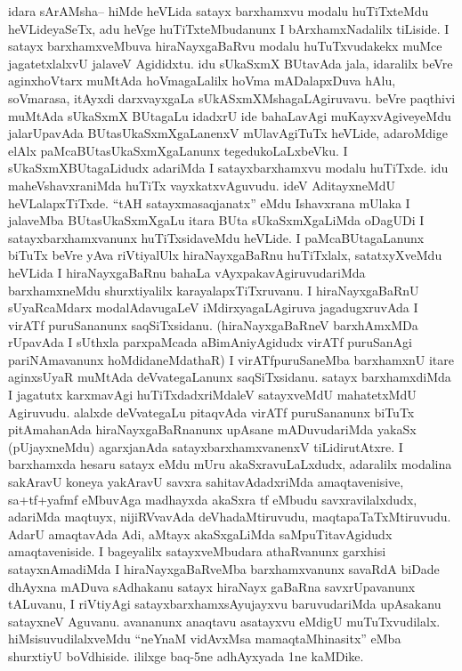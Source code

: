 \begin{artha}
idara sArAMsha{\rm --} hiMde heVLida satayx barxhamxvu modalu huTiTxteMdu heVLideyaSeTx, adu heVge huTiTxteMbudanunx I bArxhamxNadalilx tiLiside. I satayx barxhamxveMbuva hiraNayxgaBaRvu modalu huTuTxvudakekx muMce jagatetxlalxvU jalaveV Agididxtu. idu sUkaSxmX BUtavAda jala, idaralilx beVre aginxhoVtarx muMtAda hoVmagaLalilx hoVma mADalapxDuva hAlu, soVmarasa, itAyxdi darxvayxgaLa sUkASxmXMshagaLAgiruvavu. beVre paqthivi muMtAda sUkaSxmX BUtagaLu idadxrU ide bahaLavAgi muKayxvAgiveyeMdu jalarUpavAda BUtasUkaSxmXgaLanenxV mUlavAgiTuTx heVLide, adaroMdige elAlx paMcaBUtasUkaSxmXgaLanunx tegedukoLaLxbeVku. I sUkaSxmXBUtagaLidudx adariMda I satayxbarxhamxvu modalu huTiTxde. idu maheVshavxraniMda huTiTx vayxkatxvAguvudu. ideV AditayxneMdU heVLalapxTiTxde. ``tAH satayxmasaqjanatx'' eMdu Ishavxrana mUlaka I jalaveMba BUtasUkaSxmXgaLu itara BUta sUkaSxmXgaLiMda oDagUDi I satayxbarxhamxvanunx huTiTxsidaveMdu heVLide. I paMcaBUtagaLanunx biTuTx beVre yAva riVtiyalUlx hiraNayxgaBaRnu huTiTxlalx, satatxyXveMdu heVLida I hiraNayxgaBaRnu bahaLa vAyxpakavAgiruvudariMda barxhamxneMdu shurxtiyalilx karayalapxTiTxruvanu. I hiraNayxgaBaRnU sUyaRcaMdarx modalAdavugaLeV iMdirxyagaLAgiruva jagadugxruvAda I virATf puruSananunx saqSiTxsidanu. (hiraNayxgaBaRneV barxhAmxMDa rUpavAda I sUthxla parxpaMcada aBimAniyAgidudx virATf puruSanAgi pariNAmavanunx hoMdidaneMdathaR) I virATfpuruSaneMba barxhamxnU itare aginxsUyaR muMtAda deVvategaLanunx saqSiTxsidanu. satayx barxhamxdiMda I jagatutx karxmavAgi huTiTxdadxriMdaleV satayxveMdU mahatetxMdU Agiruvudu. alalxde deVvategaLu pitaqvAda virATf puruSananunx biTuTx pitAmahanAda hiraNayxgaBaRnanunx upAsane mADuvudariMda yakaSx (pUjayxneMdu) agarxjanAda satayxbarxhamxvanenxV tiLidirutAtxre. I barxhamxda hesaru satayx eMdu mUru akaSxravuLaLxdudx, adaralilx modalina sakAravU koneya yakAravU savxra sahitavAdadxriMda amaqtavenisive, sa+tf+yafmf eMbuvAga madhayxda akaSxra tf eMbudu savxravilalxdudx, adariMda maqtuyx, nijiRVvavAda deVhadaMtiruvudu, maqtapaTaTxMtiruvudu. AdarU amaqtavAda Adi, aMtayx akaSxgaLiMda saMpuTitavAgidudx amaqtaveniside. I bageyalilx satayxveMbudara athaRvanunx garxhisi satayxnAmadiMda I hiraNayxgaBaRveMba barxhamxvanunx savaRdA biDade dhAyxna mADuva sAdhakanu satayx hiraNayx gaBaRna savxrUpavanunx tALuvanu, I riVtiyAgi satayxbarxhamxsAyujayxvu baruvudariMda upAsakanu satayxneV Aguvanu. avananunx anaqtavu asatayxvu eMdigU muTuTxvudilalx. hiMsisuvudilalxveMdu ``neYnaM vidAvxMsa mamaqtaMhinasitx'' eMba shurxtiyU boVdhiside. ililxge baq-5ne adhAyxyada 1ne kaMDike.
\end{artha}

